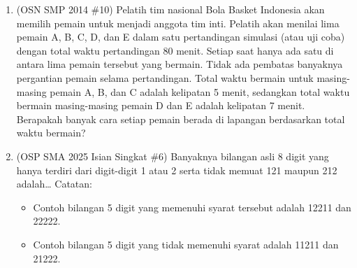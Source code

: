 \documentclass[11pt,letterpaper]{article}
\begin{document}
\begin{enumerate}[resume]
    \item (OSN SMP 2014 \#10) Pelatih tim nasional Bola Basket Indonesia akan memilih pemain untuk menjadi anggota tim inti. Pelatih akan menilai lima pemain A, B, C, D, dan E dalam satu pertandingan simulasi (atau uji coba) dengan total waktu pertandingan 80 menit. Setiap saat hanya ada satu di antara lima pemain tersebut yang bermain. Tidak ada pembatas banyaknya pergantian pemain selama pertandingan. Total waktu bermain untuk masing-masing pemain A, B, dan C adalah kelipatan 5 menit, sedangkan total waktu bermain masing-masing pemain D dan E adalah kelipatan 7 menit. Berapakah banyak cara setiap pemain berada di lapangan berdasarkan total waktu bermain?


    \item (OSP SMA 2025 Isian Singkat \#6) Banyaknya bilangan asli 8 digit yang hanya terdiri dari digit-digit 1 atau 2 serta tidak memuat 121 maupun 212 adalah\dots
    Catatan:
    \begin{itemize}
        \item Contoh bilangan 5 digit yang memenuhi syarat tersebut adalah 12211 dan 22222.
        \item Contoh bilangan 5 digit yang tidak memenuhi syarat adalah 11211 dan 21222.
    \end{itemize}


\end{enumerate}
\end{document}
